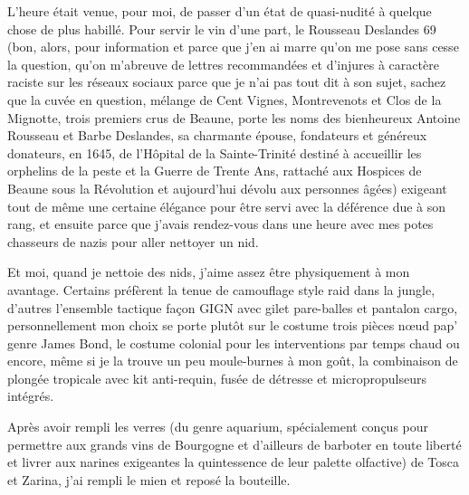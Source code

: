 L’heure était venue, pour moi, de passer d’un état de quasi-nudité à quelque chose de plus habillé. Pour servir le vin d’une part, le Rousseau Deslandes 69 (bon, alors, pour information et parce que j’en ai marre qu’on me pose sans cesse la question, qu’on m’abreuve de lettres recommandées et d’injures à caractère raciste sur les réseaux sociaux parce que je n’ai pas tout dit à son sujet, sachez que la cuvée en question, mélange de Cent Vignes, Montrevenots et Clos de la Mignotte, trois premiers crus de Beaune, porte les noms des bienheureux Antoine Rousseau et Barbe Deslandes, sa charmante épouse, fondateurs et généreux donateurs, en 1645, de l’Hôpital de la Sainte-Trinité destiné à accueillir les orphelins de la peste et la Guerre de Trente Ans, rattaché aux Hospices de Beaune sous la Révolution et aujourd’hui dévolu aux personnes âgées) exigeant tout de même une certaine élégance pour être servi avec la déférence due à son rang, et ensuite parce que j’avais rendez-vous dans une heure avec mes potes chasseurs de nazis pour aller nettoyer un nid.

%

Et moi, quand je nettoie des nids, j’aime assez être physiquement à mon avantage. Certains préfèrent la tenue de camouflage style raid dans la jungle, d’autres l’ensemble tactique façon GIGN avec gilet pare-balles et pantalon cargo, personnellement mon choix se porte plutôt sur le costume trois pièces nœud pap’ genre James Bond, le costume colonial pour les interventions par temps chaud ou encore, même si je la trouve un peu moule-burnes à mon goût, la combinaison de plongée tropicale avec kit anti-requin, fusée de détresse et micropropulseurs intégrés.

Après avoir rempli les verres (du genre aquarium, spécialement conçus pour permettre aux grands vins de Bourgogne et d’ailleurs de barboter en toute liberté et livrer aux narines exigeantes la quintessence de leur palette olfactive) de Tosca et Zarina, j’ai rempli le mien et reposé la bouteille.

